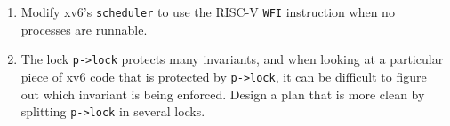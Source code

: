 \begin{enumerate}
\item Modify xv6's
\lstinline{scheduler}
to use the
RISC-V
\lstinline{WFI}
instruction
when no processes are runnable.

\item The lock
\lstinline{p->lock}
protects many invariants, and when looking at a particular piece of xv6 code that
is protected by
\lstinline{p->lock},
it can be difficult to figure out which invariant is being enforced.  Design a
plan that is more clean by splitting
\lstinline{p->lock}
in several locks.

\end{enumerate}
